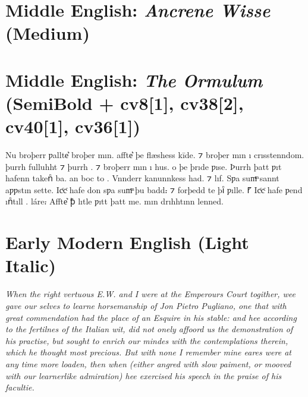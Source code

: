 \documentclass[12pt,letterpaper,openany]{book}
\begin{document}
\section{Middle English: \textit{Ancrene Wisse} (Medium)}

{\large\medium{}}

\section{Middle English: \textit{The Ormulum} (SemiBold + cv8[1], cv38[2], cv40[1], cv36[1])}

{\large\semibold{}
Nu broþerr ƿallte͛ broþerᫍ mın. affte͛ þe flæshess kīde. ⁊
broþerᫍ mın ı crısstenndom.
þurrh fulluhht ⁊ þurrh . ⁊ broþerr mın ı  hus.
 o þe þrıde ƿıse.
Þurrh þatt ƿıt hafenn takenᷠ ba. an  boc to .
Vnnderr kanunnkess had.
⁊ lıf. Sƿa sumͫ sannt aƿƿstın sette. Icͨcͨ hafe don sƿa sumͫ þu badd⹎ ⁊ forþedd te
þıᷠ ƿılle. ⹍ Icͨcͨ hafe ƿend ınᷠtıll . 
 láre⹎ Affte͛ ꝥ lıtᫎle
ƿıtt þatt me. mın drıhhtınn  lenned.}

\section{Early Modern English (Light Italic)}

\textit{\large\itallight{}When the right vertuous E.W. and I were at the Emperours Court to\-gither, wee gave our selves to learne horsemanship of Jon Pietro Pugliano, one that with great commendation had the place of an Esquire in his stable: and hee according to the fertilnes of the Italian wit, did not onely affoord us the demonstration of his practise, but sought to enrich our \mbox{mindes} with the contemplations therein, which he thought most precious. But with none I remember mine eares were at any time more loaden, then when (either angred with slow paiment, or mooved with our learnerlike admiration) hee exercised his speech in the praise of his facultie.}
\end{document}

